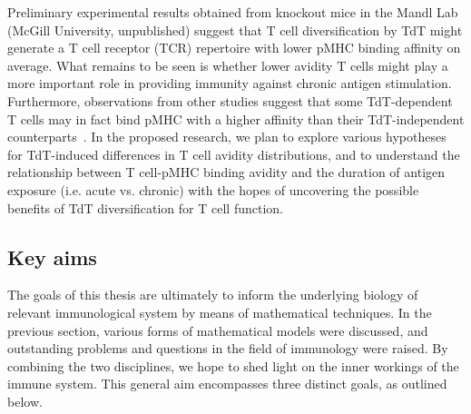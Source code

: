 Preliminary experimental results obtained from knockout mice in the Mandl Lab (McGill University, unpublished) suggest that T cell diversification by TdT might generate a T cell receptor (TCR) repertoire with lower pMHC binding affinity on average. What remains to be seen is whether lower avidity T cells might play a more important role in providing immunity against chronic antigen stimulation. Furthermore, observations from other studies suggest that some TdT-dependent T cells may in fact bind pMHC with a higher affinity than their TdT-independent counterparts~\cite{conde1998terminal,feeney2001terminal}. In the proposed research, we plan to explore various hypotheses for TdT-induced differences in T cell avidity distributions, and to understand the relationship between T cell-pMHC binding avidity and the duration of antigen exposure (i.e. acute vs. chronic) with the hopes of uncovering the possible benefits of TdT diversification for T cell function.









\subsection*{Key aims}

The goals of this thesis are ultimately to inform the underlying biology of relevant immunological system by means of mathematical techniques. In the previous section, various forms of mathematical models were discussed, and outstanding problems and questions in the field of immunology were raised. By combining the two disciplines, we hope to shed light on the inner workings of the immune system. This general aim encompasses three distinct goals, as outlined below.

